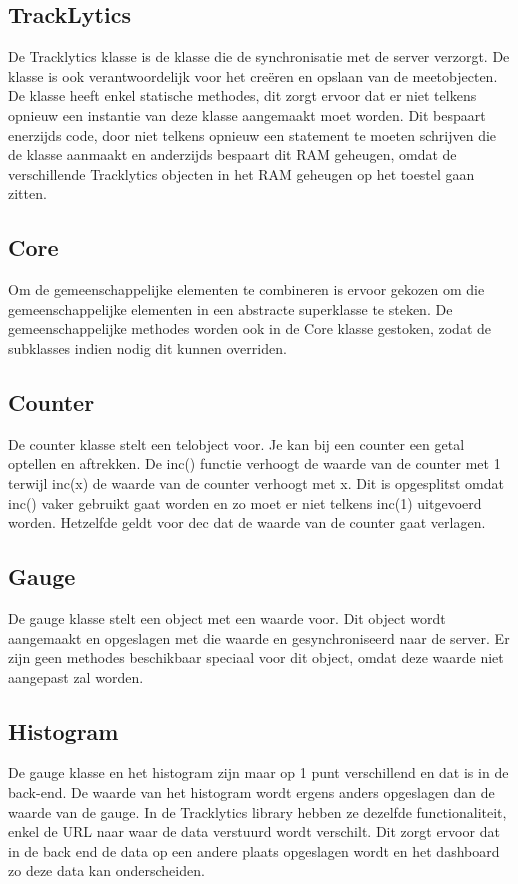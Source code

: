 \subsection{TrackLytics}
De Tracklytics klasse is de klasse die de synchronisatie met de server verzorgt. De klasse is ook verantwoordelijk voor het creëren en opslaan van de meetobjecten. De klasse heeft enkel statische methodes, dit zorgt ervoor dat er niet telkens opnieuw een instantie van deze klasse aangemaakt moet worden. Dit bespaart enerzijds code, door niet telkens opnieuw een statement te moeten schrijven die de klasse aanmaakt en anderzijds bespaart dit RAM geheugen, omdat de verschillende Tracklytics objecten in het RAM geheugen op het toestel gaan zitten.

\subsection{Core}
Om de gemeenschappelijke elementen te combineren is ervoor gekozen om die gemeenschappelijke elementen in een abstracte superklasse te steken. De gemeenschappelijke methodes worden ook in de Core klasse gestoken, zodat de subklasses indien nodig dit kunnen overriden. 

\subsection{Counter}
De counter klasse stelt een telobject voor. Je kan bij een counter een getal optellen en aftrekken. De inc() functie verhoogt de waarde van de counter met 1 terwijl inc(x) de waarde van de counter verhoogt met x. Dit is opgesplitst omdat inc() vaker gebruikt gaat worden en zo moet er niet telkens inc(1) uitgevoerd worden. Hetzelfde geldt voor dec dat de waarde van de counter gaat verlagen. 

\subsection{Gauge}
De gauge klasse stelt een object met een waarde voor. Dit object wordt aangemaakt en opgeslagen met die waarde en gesynchroniseerd naar de server. Er zijn geen methodes beschikbaar speciaal voor dit object, omdat deze waarde niet aangepast zal worden.

\subsection{Histogram}
De gauge klasse en het histogram zijn maar op 1 punt verschillend en dat is in de back-end. De waarde van het histogram wordt ergens anders opgeslagen dan de waarde van de gauge. In de Tracklytics library hebben ze dezelfde functionaliteit, enkel de URL naar waar de data verstuurd wordt verschilt. Dit zorgt ervoor dat in de back end de data op een andere plaats opgeslagen wordt en het dashboard zo deze data kan onderscheiden.

